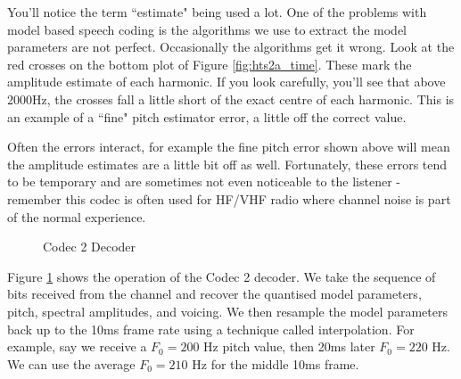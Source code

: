 \documentclass{article}
\begin{document}
{You'll notice the term ``estimate" being used a lot.  One of the problems with model based speech coding is the algorithms we use to extract the model parameters are not perfect.  Occasionally the algorithms get it wrong.  Look at the red crosses on the bottom plot of Figure \ref{fig:hts2a_time}.  These mark the amplitude estimate of each harmonic.  If you look carefully, you'll see that above 2000Hz, the crosses fall a little short of the exact centre of each harmonic.  This is an example of a ``fine" pitch estimator error, a little off the correct value.

Often the errors interact, for example the fine pitch error shown above will mean the amplitude estimates are a little bit off as well. Fortunately, these errors tend to be temporary and are sometimes not even noticeable to the listener - remember this codec is often used for HF/VHF radio where channel noise is part of the normal experience.
 
\begin{figure}[h]
\caption{Codec 2 Decoder}
\label{fig:codec2_decoder}
\begin{center}
\end{center}
\end{figure}

Figure \ref{fig:codec2_decoder} shows the operation of the Codec 2 decoder.  We take the sequence of bits received from the channel and recover the quantised model parameters, pitch, spectral amplitudes, and voicing.  We then resample the model parameters back up to the 10ms frame rate using a technique called interpolation.  For example, say we receive a $F_0=200$ Hz pitch value, then 20ms later $F_0=220$ Hz.  We can use the average $F_0=210$ Hz for the middle 10ms frame.

}
\end{document}

